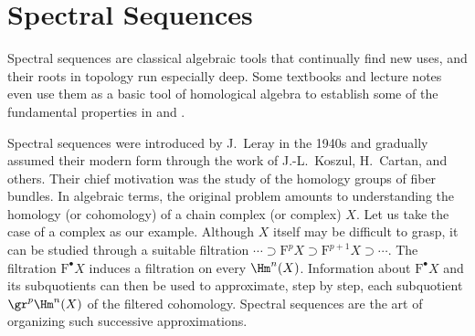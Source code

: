 
\chapter{Spectral Sequences}\label{sec:ss}
\hypertarget{o014.aljabr2.chapter5.intro-filtration-grading}{ }

Spectral sequences are classical algebraic tools that continually find new
uses, and their roots in topology run especially deep. Some textbooks and
lecture notes even use them as a basic tool of homological algebra to establish
some of the fundamental properties in  and
.

Spectral sequences were introduced by J.\ Leray in the 1940s and gradually
assumed their modern form through the work of J.-L.\ Koszul, H.\ Cartan, and
others. Their chief motivation was the study of the homology groups of fiber
bundles. In algebraic terms, the original problem amounts to understanding the
homology (or cohomology) of a chain complex (or complex) $X$. Let us take the
case of a complex as our example. Although $X$ itself may be difficult to
grasp, it can be studied through a suitable filtration
$\cdots\supset\mathrm{F}^pX\supset\mathrm{F}^{p+1}X\supset\cdots$.
The filtration $\mathrm{F}^\bullet X$ induces a filtration on every
$\Hm^n(X)$. Information about $\mathrm{F}^\bullet X$ and its subquotients can
then be used to approximate, step by step, each subquotient
$\gr^p\Hm^n(X)$ of the filtered cohomology. Spectral sequences are the art of
organizing such successive approximations.

